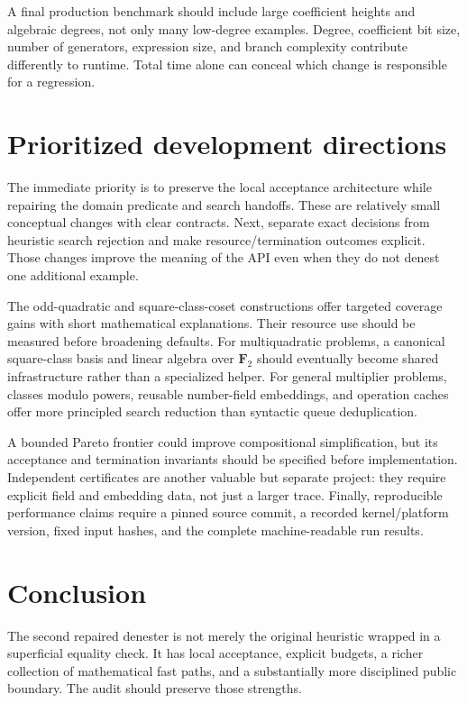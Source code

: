\documentclass[11pt,letterpaper]{article}
\numberwithin{equation}{section}
\theoremstyle{definition}\newtheorem{definition}[theorem]{Definition}
\theoremstyle{remark}\newtheorem{remark}[theorem]{Remark}
\begin{document}
A final production benchmark should include large coefficient heights and algebraic degrees, not only many low-degree examples. Degree, coefficient bit size, number of generators, expression size, and branch complexity contribute differently to runtime. Total time alone can conceal which change is responsible for a regression.

\section{Prioritized development directions}
The immediate priority is to preserve the local acceptance architecture while repairing the domain predicate and search handoffs. These are relatively small conceptual changes with clear contracts. Next, separate exact decisions from heuristic search rejection and make resource/termination outcomes explicit. Those changes improve the meaning of the API even when they do not denest one additional example.

The odd-quadratic and square-class-coset constructions offer targeted coverage gains with short mathematical explanations. Their resource use should be measured before broadening defaults. For multiquadratic problems, a canonical square-class basis and linear algebra over $\mathbf F_2$ should eventually become shared infrastructure rather than a specialized helper. For general multiplier problems, classes modulo powers, reusable number-field embeddings, and operation caches offer more principled search reduction than syntactic queue deduplication.

A bounded Pareto frontier could improve compositional simplification, but its acceptance and termination invariants should be specified before implementation. Independent certificates are another valuable but separate project: they require explicit field and embedding data, not just a larger trace. Finally, reproducible performance claims require a pinned source commit, a recorded kernel/platform version, fixed input hashes, and the complete machine-readable run results.

\section{Conclusion}
The second repaired denester is not merely the original heuristic wrapped in a superficial equality check. It has local acceptance, explicit budgets, a richer collection of mathematical fast paths, and a substantially more disciplined public boundary. The audit should preserve those strengths.
\end{document}
